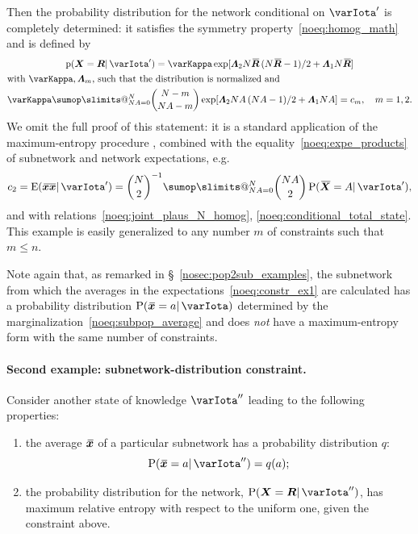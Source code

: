 \documentclass{article}
\makeatletter
\theoremstyle{remark}
\theoremstyle{innote}
\def\sum{\DOTSI\sumop\slimits@}
\newcommand*{\citep}{\parencites}
\renewcommand*{\|}{\mathpunct{|}}%
\renewcommand{\le}{\leqslant}%
\newcommand*{\pf}{\mathrm{p}}%
\newcommand*{\p}{\mathrm{P}}%
\newcommand*{\sect}{\S}%
\newcommand*{\eg}{{e.g.}}
\newcommand*{\E}{\mathrm{E}}
\DeclarePairedDelimiter\expp{(}{)}
\newcommand*{\expe}{\E\expp}%
\theoremstyle{simple}
\newcommand*{\widebar}[1]{{\mkern1.5mu\skew{2}\overline{\mkern-1.5mu#1\mkern-1.5mu}\mkern 1.5mu}}
\newcommand*{\av}{\widebar} %
\newcommand*{\sav}{\widebar} %
\newcommand*{\yxx}{x}%
\newcommand*{\yx}{\bm{\yxx}}%
\newcommand*{\yxs}{\sav{\yx}}%
\newcommand*{\yX}{\bm{X}}%
\newcommand*{\yXf}{\av{\yX}}%
\newcommand*{\yR}{\bm{R}}%
\newcommand*{\yRf}{\av{\yR}}%
\newcommand*{\yH}{\varIota}
\newcommand*{\yHa}{\varIota'}
\newcommand*{\yHb}{\varIota''}
\newcommand*{\yL}{\bm{\varLambda}}
\makeatother
\begin{document}
\medskip Then the probability distribution for the network conditional on $\yHa$
is completely determined: it satisfies the symmetry
property~\eqref{noeq:homog_math} and is defined by
\begin{multline}
  \label{noeq:pop_distr_maxent1}
  \pf(\yX =\yR \|\yHa) =
\varKappa\exp[\yL_2 N\yRf\,(N\yRf-1)/2 + \yL_1 N\yRf]
\\
\!\begin{aligned}[b]
&\text{with $\varKappa, \yL_m$, such that the distribution is normalized and}
\\
&\varKappa\sum_{N A=0}^N %
\binom{N-m}{N A-m}
\exp[\yL_2 N A\,(N A-1)/2 + \yL_1 N A]
= c_m, \quad m=1,2.
\end{aligned}
\end{multline}
We omit the full proof of this statement: it is a standard application of
the maximum-entropy procedure
\citep[\eg:][]{jaynes1957,jaynes1963,good1963,jaynes1967,jaynes1979b,vancampenhoutetal1981,sivia1990,fangetal1997,bretthorst2013},
combined with the equality~\eqref{noeq:expe_products} of subnetwork and
network expectations, \eg
\begin{equation}
  \label{noeq:exploit_eq_expects}
  c_2 = \expe{\sav{\yx\yx}\|\yHa} = 
\binom{N}{2}^{-1}
\sum_{N A=0}^N %
\binom{N A}{2} \, \p(\yXf = A\|\yHa),
\end{equation}
and with relations~\eqref{noeq:joint_plaus_N_homog},
\eqref{noeq:conditional_total_state}. This example is easily generalized to
any number $m$ of constraints such that  $m\le n$.

Note again that, as remarked in \sect~\ref{nosec:pop2sub_examples}, the
subnetwork from which the averages in the
expectations~\eqref{noeq:constr_ex1} are calculated has a probability
distribution $\p(\yxs =a \|\yH)$ determined by the
marginalization~\eqref{noeq:subpop_average} and does \emph{not} have a
maximum-entropy form with the same number of constraints.


\paragraph{Second example: subnetwork-distribution constraint.}
\label{nosec:maxent_fullsubpop}
Consider another state of knowledge $\yHb$ leading to the following
properties:
\begin{enumerate}%
\item the average $\yxs$ of a particular
  subnetwork has a probability distribution $q$:
  \begin{equation}
    \label{noeq:constr_subpop_distr}
    \p(\yxs =a \|\yHb) = q(a);
  \end{equation}
\item the probability distribution for the network, $\p(\yX = \yR
  \|\yHb)$, has maximum relative entropy with respect to the uniform
  one, given the constraint above.
\end{enumerate}
\end{document}
